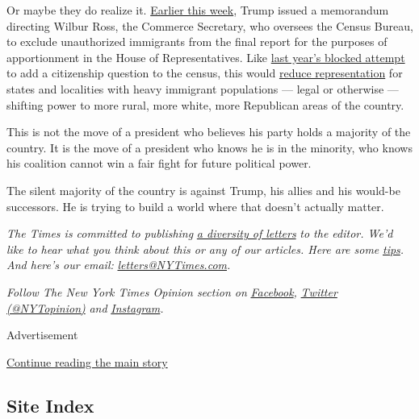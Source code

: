 Or maybe they do realize it.
\href{https://www.vox.com/policy-and-politics/2020/7/21/21328714/trump-executive-order-immigration-census-2020-redistricting}{Earlier
this week}, Trump issued a memorandum directing Wilbur Ross, the
Commerce Secretary, who oversees the Census Bureau, to exclude
unauthorized immigrants from the final report for the purposes of
apportionment in the House of Representatives. Like
\href{https://www.scotusblog.com/2019/07/trump-administration-ends-effort-to-include-citizenship-question-on-2020-census/}{last
year's blocked attempt} to add a citizenship question to the census,
this would
\href{https://www.washingtonpost.com/politics/2019/06/06/where-citizenship-question-could-cause-census-miss-millions-hispanics-why-thats-big-deal/?arc404=true}{reduce
representation} for states and localities with heavy immigrant
populations --- legal or otherwise --- shifting power to more rural,
more white, more Republican areas of the country.

This is not the move of a president who believes his party holds a
majority of the country. It is the move of a president who knows he is
in the minority, who knows his coalition cannot win a fair fight for
future political power.

The silent majority of the country is against Trump, his allies and his
would-be successors. He is trying to build a world where that doesn't
actually matter.

\emph{The Times is committed to publishing}
\href{https://www.nytimes3xbfgragh.onion/2019/01/31/opinion/letters/letters-to-editor-new-york-times-women.html}{\emph{a
diversity of letters}} \emph{to the editor. We'd like to hear what you
think about this or any of our articles. Here are some}
\href{https://help.nytimes3xbfgragh.onion/hc/en-us/articles/115014925288-How-to-submit-a-letter-to-the-editor}{\emph{tips}}\emph{.
And here's our email:}
\href{mailto:letters@NYTimes.com}{\emph{letters@NYTimes.com}}\emph{.}

\emph{Follow The New York Times Opinion section on}
\href{https://www.facebookcorewwwi.onion/nytopinion}{\emph{Facebook}}\emph{,}
\href{http://twitter.com/NYTOpinion}{\emph{Twitter (@NYTopinion)}}
\emph{and}
\href{https://www.instagram.com/nytopinion/}{\emph{Instagram}}\emph{.}

Advertisement

\protect\hyperlink{after-bottom}{Continue reading the main story}

\hypertarget{site-index}{%
\subsection{Site Index}\label{site-index}}

